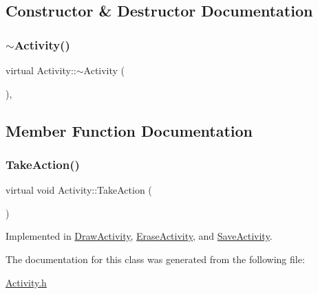 \subsection{Constructor \& Destructor Documentation}
\mbox{\label{class_activity_aef5c28e82c93f6da8a924d088bc9b58b}} 
\subsubsection{\texorpdfstring{$\sim$Activity()}{~Activity()}}
{\footnotesize\ttfamily virtual Activity\+::$\sim$\+Activity (\begin{DoxyParamCaption}{ }\end{DoxyParamCaption})\hspace{0.3cm}{\ttfamily [virtual]}, {\ttfamily [default]}}



\subsection{Member Function Documentation}
\mbox{\label{class_activity_af1bed13c5ae595ee7940dee2d34f7989}} 
\subsubsection{\texorpdfstring{TakeAction()}{TakeAction()}}
{\footnotesize\ttfamily virtual void Activity\+::\+Take\+Action (\begin{DoxyParamCaption}{ }\end{DoxyParamCaption})\hspace{0.3cm}{\ttfamily [pure virtual]}}



Implemented in \mbox{\hyperlink{class_draw_activity_a0ca36e1d0c5e3ff16fe1e33432d245bf}{Draw\+Activity}}, \mbox{\hyperlink{class_erase_activity_a3d5533cbfa19a18a58bb77a5e9daf586}{Erase\+Activity}}, and \mbox{\hyperlink{class_save_activity_af8bd3121c8109caedd8f4ae481879f1a}{Save\+Activity}}.



The documentation for this class was generated from the following file\+:\begin{DoxyCompactItemize}
\item 
\mbox{\hyperlink{_activity_8h}{Activity.\+h}}\end{DoxyCompactItemize}
